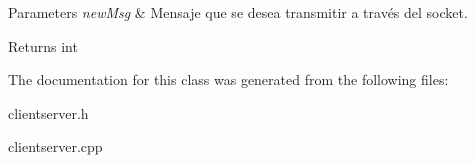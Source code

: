 \begin{DoxyParams}{Parameters}
{\em new\+Msg} & Mensaje que se desea transmitir a través del socket. \\
\hline
\end{DoxyParams}
\begin{DoxyReturn}{Returns}
int 
\end{DoxyReturn}


The documentation for this class was generated from the following files\+:\begin{DoxyCompactItemize}
\item 
clientserver.\+h\item 
clientserver.\+cpp\end{DoxyCompactItemize}
